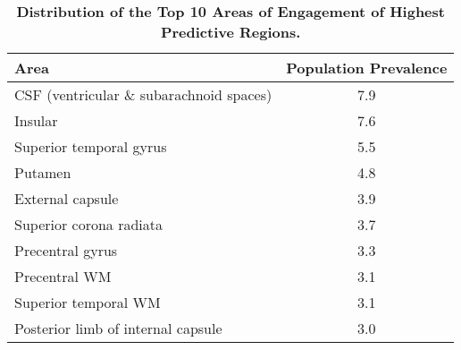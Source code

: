 \begin{table}[ht]
\centering
\begin{tabular}{lc}
  \hline
Area & Population Prevalence \\ 
  \hline
CSF (ventricular \& subarachnoid spaces) & 7.9 \\ 
  Insular & 7.6 \\ 
  Superior temporal gyrus & 5.5 \\ 
  Putamen & 4.8 \\ 
  External capsule & 3.9 \\ 
  Superior corona radiata & 3.7 \\ 
  Precentral gyrus & 3.3 \\ 
  Precentral WM & 3.1 \\ 
  Superior temporal WM & 3.1 \\ 
  Posterior limb of internal capsule & 3.0 \\ 
   \hline
\end{tabular}
\caption{{\bf Distribution of the Top 10 Areas of Engagement of Highest Predictive Regions.}} 
\label{t:breakdown}
\end{table}

